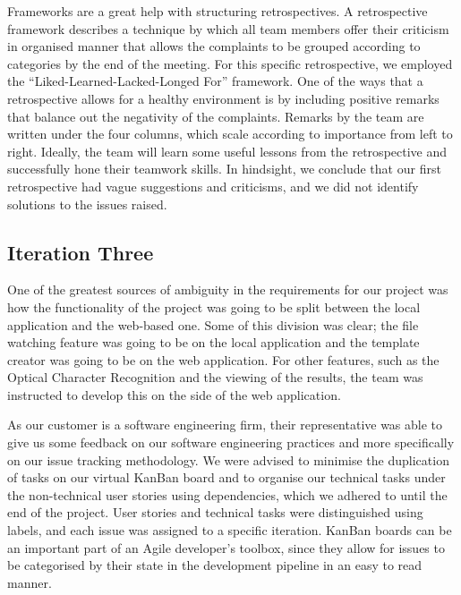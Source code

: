 \documentclass{l3proj}
\begin{document}
Frameworks are a great help with structuring retrospectives. A retrospective framework describes a technique by which all team members offer their criticism in organised manner that allows the complaints to be grouped according to categories by the end of the meeting. For this specific retrospective, we employed the ``Liked-Learned-Lacked-Longed For'' framework. One of the ways that a retrospective allows for a healthy environment is by including positive remarks that balance out the negativity of the complaints. Remarks by the team are written under the four columns, which scale according to importance from left to right. Ideally, the team will learn some useful lessons from the retrospective and successfully hone their teamwork skills. In hindsight, we conclude that our first retrospective had vague suggestions and criticisms, and we did not identify solutions to the issues raised.

\subsection{Iteration Three}

One of the greatest sources of ambiguity in the requirements for our project was how the functionality of the project was going to be split between the local application and the web-based one. Some of this division was clear; the file watching feature was going to be on the local application and the template creator was going to be on the web application. For other features, such as the Optical Character Recognition and the viewing of the results, the team was instructed to develop this on the side of the web application.

As our customer is a software engineering firm, their representative was able to give us some feedback on our software engineering practices and more specifically on our issue tracking methodology. We were advised to minimise the duplication of tasks on our virtual KanBan board \cite{Skarin} and to organise our technical tasks under the non-technical user stories using dependencies, which we adhered to until the end of the project. User stories and technical tasks were distinguished using labels, and each issue was assigned to a specific iteration. KanBan boards can be an important part of an Agile developer’s toolbox, since they allow for issues to be categorised by their state in the development pipeline in an easy to read manner.
\end{document}
